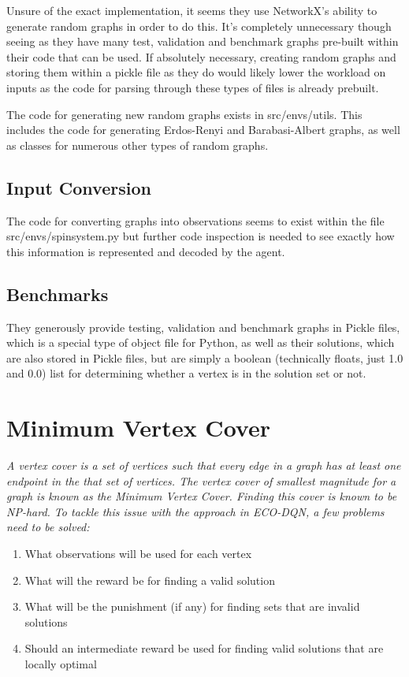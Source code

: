 \documentclass{article}
\begin{document}
Unsure of the exact implementation, it seems they use NetworkX's ability to generate random graphs in order to do this. It's completely unnecessary though seeing as they have many test, validation and benchmark graphs pre-built within their code that can be used. If absolutely necessary, creating random graphs and storing them within a pickle file as they do would likely lower the workload on inputs as the code for parsing through these types of files is already prebuilt.

The code for generating new random graphs exists in src/envs/utils. This includes the code for generating Erdos-Renyi and Barabasi-Albert graphs, as well as classes for numerous other types of random graphs.

\subsection{Input Conversion}

The code for converting graphs into observations seems to exist within the file src/envs/spinsystem.py but further code inspection is needed to see exactly how this information is represented and decoded by the agent.

\subsection{Benchmarks}

They generously provide testing, validation and benchmark graphs in Pickle files, which is a special type of object file for Python, as well as their solutions, which are also stored in Pickle files, but are simply a boolean (technically floats, just 1.0 and 0.0) list for determining whether a vertex is in the solution set or not.

\section{Minimum Vertex Cover}

\textit{A vertex cover is a set of vertices such that every edge in a graph has at least one endpoint in the that set of vertices. The vertex cover of smallest magnitude for a graph is known as the Minimum Vertex Cover. Finding this cover is known to be NP-hard. To tackle this issue with the approach in ECO-DQN, a few problems need to be solved:}

\begin{enumerate}
    \item What observations will be used for each vertex 
    \item What will the reward be for finding a valid solution 
    \item What will be the punishment (if any) for finding sets that are invalid solutions 
    \item Should an intermediate reward be used for finding valid solutions that are locally optimal
\end{enumerate}
\end{document}
